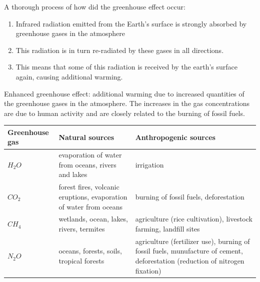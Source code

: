 \documentclass[a4paper,12pt]{article}
\begin{document}
A thorough process of how did the greenhouse effect occur:
\begin{enumerate}
  \item Infrared radiation emitted from the Earth's surface is strongly absorbed by greenhouse gases in the atmosphere
  \item This radiation is in turn re-radiated by these gases in all directions.
  \item This means that some of this radiation is received by the earth's surface again, causing additional warming.
\end{enumerate}
Enhanced greenhouse effect:  additional warming due to increased quantities of the greenhouse gases in the atmosphere. The increases in the gas concentrations are due to human activity and are closely related to the burning of fossil fuels.
\begin{center}
  \begin{tabularx}{\textwidth}{@{}|Y |Y |Y|@{}}
\toprule
\textbf{Greenhouse gas} & \textbf{Natural sources} & \textbf{Anthropogenic sources}\\
\midrule
$H_2O$ & evaporation of water from oceans, rivers and lakes & irrigation \\\hline
$CO_2$ & forest fires, volcanic eruptions, evaporation of water from oceans & burning of fossil fuels, deforestation \\\hline
$CH_4$ & wetlands, ocean, lakes, rivers, termites & agriculture (rice cultivation), livestock farming, landfill sites \\\hline
$N_2O$ & oceans, forests, soils, tropical forests & agriculture (fertilizer use), burning of fossil fuels, munufacture of cement, deforestation (reduction of nitrogen fixation) \\
\bottomrule
\end{tabularx}
\end{center}
\end{document}
